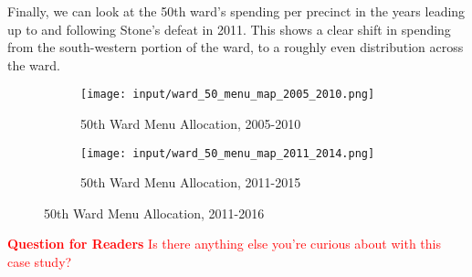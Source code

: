 Finally, we can look at the 50th ward's spending per precinct in the years leading up to and following Stone's defeat in 2011.
This shows a clear shift in spending from the south-western portion of the ward, to a roughly even distribution across the ward.

\begin{figure}[H]
    \centering
    \begin{subfigure}[b]{0.45\textwidth} %
    \texttt{[image: input/ward\_50\_menu\_map\_2005\_2010.png]}
    \caption{50th Ward Menu Allocation, 2005-2010}
    \end{subfigure}
    \hfill %
    \begin{subfigure}[b]{0.45\textwidth}
    \texttt{[image: input/ward\_50\_menu\_map\_2011\_2014.png]}
    \caption{50th Ward Menu Allocation, 2011-2015}
    \end{subfigure}
    \caption{50th Ward Menu Allocation, 2011-2016}
    \label{fig:stone_support_maps}
\end{figure}

\textcolor{red}{\textbf{Question for Readers} Is there anything else you're curious about with this case study?}
